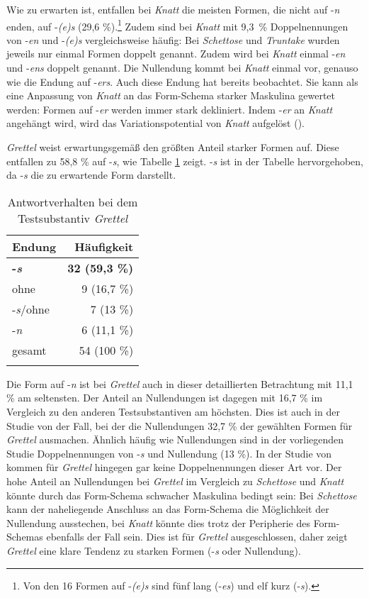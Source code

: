 Wie zu erwarten ist, entfallen bei \textit{Knatt} die meisten Formen, die nicht auf -\textit{n} enden, auf -\textit{(e)s} (29,6 \%).\footnote{Von den 16 Formen auf -\textit{(e)s} sind fünf lang (-\textit{es}) und elf kurz (-\textit{s}).} Zudem sind bei \textit{Knatt} mit 9,3~\% Doppelnennungen von -\textit{en} und -\textit{(e)s} vergleichsweise häufig: Bei \textit{Schettose} und \textit{Truntake} wurden jeweils nur einmal Formen doppelt genannt. Zudem wird bei \textit{Knatt} einmal -\textit{en} und -\textit{ens} doppelt genannt. Die Nullendung kommt bei \textit{Knatt} einmal vor, genauso wie die Endung auf -\textit{ers}. Auch diese Endung hat \textcite[167--168]{Schmitt.2019} bereits beobachtet. Sie kann als eine Anpassung von \textit{Knatt} an das Form-Schema starker Maskulina gewertet werden: Formen auf -\textit{er} werden immer stark dekliniert. Indem -\textit{er} an \textit{Knatt} angehängt wird, wird das Variationspotential von \textit{Knatt} aufgelöst (\cite[168]{Schmitt.2019}). 



\textit{Grettel} weist erwartungsgemäß den größten Anteil starker Formen auf. Diese entfallen zu 58,8 \% auf -\textit{s}, wie Tabelle \ref{grettel} zeigt.  -\textit{s} ist in der Tabelle hervorgehoben, da -\textit{s} die zu erwartende Form darstellt.

\begin{table}
\begin{tabular}{lr}
\lsptoprule
Endung  & Häufigkeit \\ 
\midrule
\textbf{-\textit{s}}  &  \textbf{32 (59,3 \%)} \\
ohne  &   9 (16,7 \%) \\ 
-\textit{s}/ohne &   7 (13 \%) \\ 
-\textit{n} &   6 (11,1 \%) \\ 
\midrule
gesamt  & 54 (100 \%) \\
\lspbottomrule
\end{tabular}
\caption{Antwortverhalten bei dem Testsubstantiv \textit{Grettel}}
\label{grettel}
\end{table}

Die Form auf -\textit{n} ist bei \textit{Grettel} auch in dieser detaillierten Betrachtung mit 11,1 \% am seltensten. Der Anteil an Nullendungen ist dagegen mit 16,7 \% im Vergleich zu den anderen Testsubstantiven am höchsten. Dies ist auch in der Studie von \textcite[167]{Schmitt.2019} der Fall, bei der die Nullendungen 32,7 \% der gewählten Formen für \textit{Grettel} ausmachen. Ähnlich häufig wie Nullendungen sind in der vorliegenden Studie Doppelnennungen von -\textit{s} und Nullendung (13 \%). In der Studie von \textcite[167]{Schmitt.2019} kommen für \textit{Grettel} hingegen gar keine Doppelnennungen dieser Art vor. Der hohe Anteil an Nullendungen bei \textit{Grettel} im Vergleich zu \textit{Schettose} und \textit{Knatt} könnte durch das Form-Schema schwacher Maskulina bedingt sein: Bei \textit{Schettose} kann der naheliegende Anschluss an das Form-Schema die Möglichkeit der Nullendung ausstechen, bei \textit{Knatt} könnte dies trotz der Peripherie des Form-Schemas ebenfalls der Fall sein. Dies ist für \textit{Grettel} ausgeschlossen, daher zeigt \textit{Grettel} eine klare Tendenz zu starken Formen (-\textit{s} oder Nullendung).   

